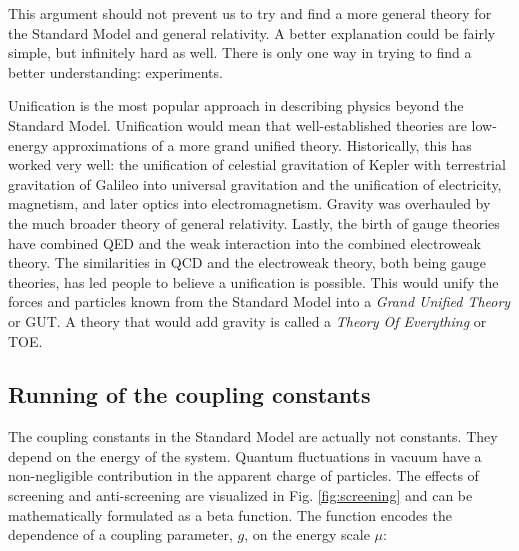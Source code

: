 This argument should not prevent us to try and find a more general theory for the Standard Model and general relativity. A better explanation could be fairly simple, but infinitely hard as well. There is only one way in trying to find a better understanding: experiments.

Unification is the most popular approach in describing physics beyond the Standard Model. Unification would mean that well-established theories are low-energy approximations of a more grand unified theory. Historically, this has worked very well: the unification of celestial gravitation of Kepler with terrestrial gravitation of Galileo into universal gravitation and the unification of electricity, magnetism, and later optics into electromagnetism. Gravity was overhauled by the much broader theory of general relativity. Lastly, the birth of gauge theories have combined QED and the weak interaction into the combined electroweak theory. The similarities in QCD and the electroweak theory, both being gauge theories, has led people to believe a unification is possible. This would unify the forces and particles known from the Standard Model into a \textit{Grand Unified Theory} or GUT. A theory that would add gravity is called a \textit{Theory Of Everything} or TOE.

\iffalse
\subsection{Running of the coupling constants}
\label{subsec:running}
The coupling constants in the Standard Model are actually not constants. They depend on the energy of the system. Quantum fluctuations in vacuum have a non-negligible contribution in the apparent charge of particles. The effects of screening and anti-screening are visualized in Fig. \ref{fig:screening} and can be mathematically formulated as a beta function. The function encodes the dependence of a coupling parameter, $g$, on the energy scale $\mu$:


